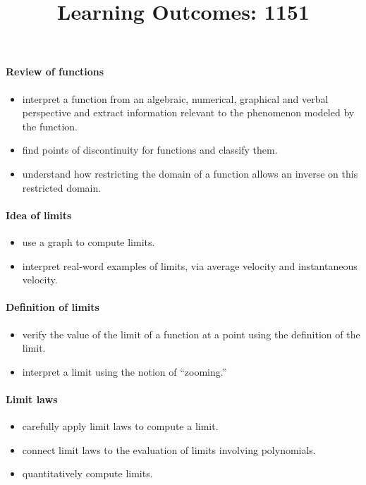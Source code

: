 \documentclass{amsart}
\title{Learning Outcomes: 1151}
\begin{document}
\maketitle


\paragraph*{Review of functions}
\begin{itemize}
\item interpret a function from an algebraic, numerical, graphical and
  verbal perspective and extract information relevant to the
  phenomenon modeled by the function.
\item find points of discontinuity for functions and classify them.
\item understand how restricting the domain of a function allows an
  inverse on this restricted domain.
\end{itemize}

\paragraph*{Idea of limits}
\begin{itemize}
\item use a graph to compute limits. 
\item interpret real-word examples of limits, via average velocity and
  instantaneous velocity.
\end{itemize}


\paragraph*{Definition of limits}
\begin{itemize}
\item verify the value of the limit of a function at a point using the
  definition of the limit.
\item interpret a limit using the notion of ``zooming.''
\end{itemize}

\paragraph*{Limit laws}
\begin{itemize}
\item carefully apply limit laws to compute a limit.
\item connect limit laws to the evaluation of limits involving
  polynomials.
\item quantitatively compute limits. 
\end{itemize}
\end{document}
